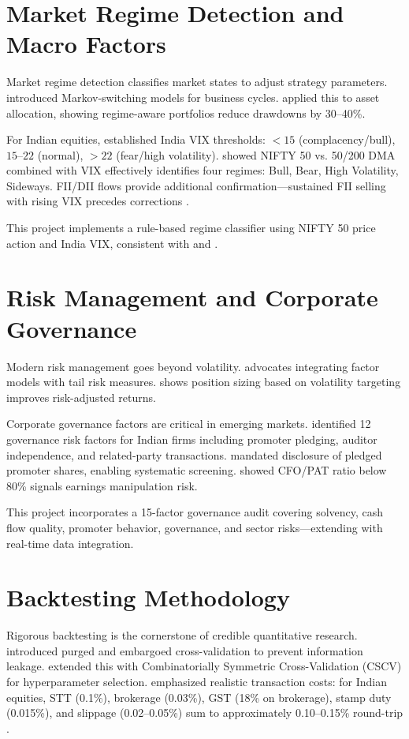 \documentclass[12pt,a4paper]{report}
\begin{document}
\section{Market Regime Detection and Macro Factors}
Market regime detection classifies market states to adjust strategy parameters. \cite{hamilton1989new} introduced Markov-switching models for business cycles. \cite{ang2012regime} applied this to asset allocation, showing regime-aware portfolios reduce drawdowns by 30--40\%. 

For Indian equities, \cite{bhaduri2020vix} established India VIX thresholds: $< 15$ (complacency/bull), $15\text{--}22$ (normal), $> 22$ (fear/high volatility). \cite{sarkar2021macro} showed NIFTY 50 vs. 50/200 DMA combined with VIX effectively identifies four regimes: Bull, Bear, High Volatility, Sideways. FII/DII flows provide additional confirmation---sustained FII selling with rising VIX precedes corrections \cite{nse2024annual}.

This project implements a rule-based regime classifier using NIFTY 50 price action and India VIX, consistent with \cite{bhaduri2020vix} and \cite{sarkar2021macro}.

\section{Risk Management and Corporate Governance}
Modern risk management goes beyond volatility. \cite{pedersen2015efficient} advocates integrating factor models with tail risk measures. \cite{clarke2011risk} shows position sizing based on volatility targeting improves risk-adjusted returns.

Corporate governance factors are critical in emerging markets. \cite{chakraborty2019governance} identified 12 governance risk factors for Indian firms including promoter pledging, auditor independence, and related-party transactions. \cite{sebi2021pledging} mandated disclosure of pledged promoter shares, enabling systematic screening. \cite{datta2020cash} showed CFO/PAT ratio below 80\% signals earnings manipulation risk.

This project incorporates a 15-factor governance audit covering solvency, cash flow quality, promoter behavior, governance, and sector risks---extending \cite{chakraborty2019governance} with real-time data integration.

\section{Backtesting Methodology}
Rigorous backtesting is the cornerstone of credible quantitative research. \cite{bailey2017purged} introduced purged and embargoed cross-validation to prevent information leakage. \cite{lopez2019machine} extended this with Combinatorially Symmetric Cross-Validation (CSCV) for hyperparameter selection. \cite{marcos2020backtesting} emphasized realistic transaction costs: for Indian equities, STT (0.1\%), brokerage (0.03\%), GST (18\% on brokerage), stamp duty (0.015\%), and slippage (0.02--0.05\%) sum to approximately 0.10--0.15\% round-trip \cite{sebi2023circular}.
\end{document}

